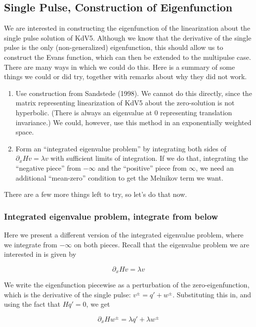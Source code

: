 \documentclass[12pt]{article}
\begin{document}
\subsection*{Single Pulse, Construction of Eigenfunction}

We are interested in constructing the eigenfunction of the linearization about the single pulse solution of KdV5. Although we know that the derivative of the single pulse is the only (non-generalized) eigenfunction, this should allow us to construct the Evans function, which can then be extended to the multipulse case. There are many ways in which we could do this. Here is a summary of some things we could or did try, together with remarks about why they did not work.

\begin{enumerate} 
	\item Use construction from Sandstede (1998). We cannot do this directly, since the matrix representing linearization of KdV5 about the zero-solution is not hyperbolic. (There is always an eigenvalue at 0 representing translation invariance.) We could, however, use this method in an exponentially weighted space.
	\item Form an ``integrated eigenvalue problem'' by integrating both sides of $\partial_x H v = \lambda v$ with sufficient limits of integration. If we do that, integrating the ``negative piece'' from $-\infty$ and the ``positive'' piece from $\infty$, we need an additional ``mean-zero'' condition to get the Melnikov term we want.
\end{enumerate}

There are a few more things left to try, so let's do that now.

\subsubsection*{Integrated eigenvalue problem, integrate from below}

Here we present a different version of the integrated eigenvalue problem, where we integrate from $-\infty$ on both pieces. Recall that the eigenvalue problem we are interested in is given by

\[
\partial_x H v = \lambda v
\]

We write the eigenfunction piecewise as a perturbation of the zero-eigenfunction, which is the derivative of the single pulse: $v^\pm = q' + w^\pm$. Substituting this in, and using the fact that $Hq' = 0$, we get

\[
\partial_x H w^\pm = \lambda q' + \lambda w^\pm
\]
\end{document}
